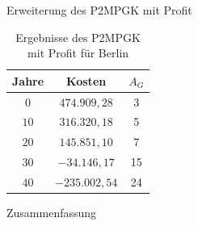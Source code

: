 \documentclass{beamer}
\begin{document}
\begin{frame}{Erweiterung des P2MPGK mit Profit}
	\begin{table}[!htbp]
		\centering
		\begin{tabular}{c|c|c}
			\centering
			Jahre & Kosten & $A_G$ \\	
			\hline
			$0$   	 &  \(474.909,28\) & 3  \\
			$10$ 	&  \(316.320,18\) & 5  \\
			$20$   	&   \(145.851,10\) & 7  \\
			$30$    &   $ -34.146,17$	& 15  \\
			$40$    & $-235.002,54$ &  24 \\
		\end{tabular}
		\caption{Ergebnisse des P2MPGK mit Profit f\"ur Berlin}
	\end{table}
\end{frame}

\begin{frame}{Zusammenfassung}

\end{frame}

	
\end{document}

